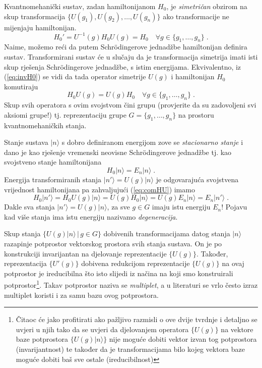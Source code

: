 Kvantnomehanički sustav, zadan
hamiltonijanom $H_0$, je \emph{simetričan} obzirom na skup transformacija
$\{ U(g_1), U(g_2), \ldots, U(g_n)\}$ ako transformacije ne mijenjaju
hamiltonijan. 
\begin{equation}
    H_{0}' = U^{-1}(g) H_{0} U(g) = H_{0} \quad \forall  g \in \{g_1,\ldots, g_n\}\;.
 \label{eq:invH0}
\end{equation}
Naime, možemo reći da putem Schr\"{o}dingerove jednadžbe 
hamiltonijan definira sustav. Transformirani sustav će u slučaju da
je transformacija simetrija imati isti skup rješenja Schr\"{o}dingerove jednadžbe,
s istim energijama.
Ekvivalentno, iz (\ref{eq:invH0}) se vidi da tada operator
simetrije $U(g)$ i hamiltonijan $H_0$ komutiraju
\begin{equation}
  H_{0}U(g)=U(g)H_0 \quad \forall  g \in \{g_1,\ldots, g_n\} \;.
  \label{eq:comHU}
\end{equation}
Skup svih operatora s ovim svojstvom čini grupu (provjerite da su
zadovoljeni svi aksiomi grupe!) tj.
reprezentaciju grupe $G=\{g_1,\ldots, g_n\}$ na prostoru kvantnomehaničkih 
stanja.

Stanje sustava $|n\rangle$ s dobro definiranom energijom  zove se
\emph{stacionarno stanje} i dano je kao rješenje vremenski 
neovisne Schr\"{o}dingerove jednadžbe tj. kao svojstveno stanje hamiltonijana
\begin{displaymath}
  H_0 |n\rangle = E_n | n \rangle \;.
\end{displaymath}
Energija transformiranih stanja $|n'\rangle = U(g)|n\rangle$ je
odgovarajuća svojstvena vrijednost hamiltonijana pa zahvaljujući
(\ref{eq:comHU}) imamo
\begin{displaymath}
  H_0 |n'\rangle = H_0 U(g)|n\rangle = U(g) H_0 |n\rangle =
 U(g) E_n |n\rangle = E_n |n'\rangle \;.
\end{displaymath}
Dakle sva stanja $|n'\rangle = U(g)|n\rangle$, za sve $g\in G$ imaju
istu energiju $E_n$! Pojavu kad više stanja ima istu energiju 
nazivamo \emph{degeneracija}.

Skup stanja $\{U(g)|n \rangle \,|\, g\in G\}$ dobivenih transformacijama
datog stanja $|n\rangle$ razapinje
potprostor vektorskog prostora svih stanja sustava. On je
po konstrukciji invarijantan na djelovanje reprezentacije $\{ U(g) \}$.
Također, reprezentacija $\{ U'(g) \}$ dobivena redukcijom reprezentacije
$\{ U(g) \}$ na ovaj potprostor je ireducibilna što isto slijedi
iz načina na koji smo konstruirali potprostor\footnote{Čitaoc će jako
profitirati ako pažljivo razmisli o ove dvije tvrdnje i detaljno se
uvjeri u njih tako da se uvjeri da djelovanjem operatora $\{ U(g) \}$
na vektore baze potprostora $\{U(g)|n \rangle \}$ nije moguće
dobiti vektor izvan tog potprostora (invarijantnost) te također da
je transformacijama bilo kojeg vektora baze moguće dobiti baš sve
ostale (ireducibilnost)}.
Takav potprostor naziva se \emph{multiplet}, a u literaturi se
vrlo često izraz multiplet koristi i za samu bazu ovog potprostora.

